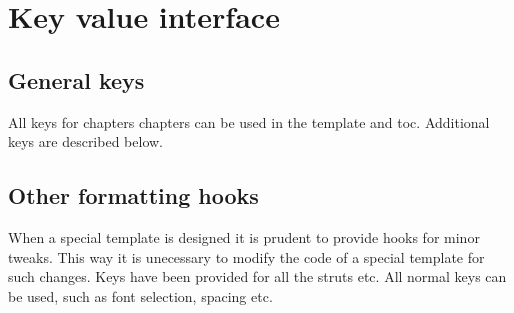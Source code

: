 \section{Key value interface}
\subsection{General keys}
All keys for chapters chapters can be used in the template and toc.
Additional keys are described below.


\subsection{Other formatting hooks}

When a special template is designed it is prudent to provide hooks for minor tweaks. This way it is unecessary to modify the code of a special template for such changes. Keys have been provided for all the struts etc.
All normal keys can be used, such as font selection, spacing etc.

\lipsum
